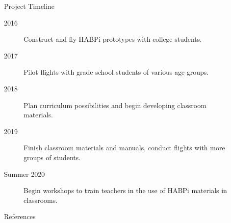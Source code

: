\documentclass[final]{beamer}
\newlength{\sepwid}
\newlength{\onecolwid}
\newlength{\twocolwid}
\begin{document}
\begin{frame}[t]
\begin{columns}[t]
\begin{column}{\twocolwid}
\begin{columns}[t,totalwidth=\twocolwid]
\begin{column}{\onecolwid}
\end{column} %

\end{columns} %

\end{column} %

\begin{column}{\sepwid}\end{column} %

\begin{column}{\onecolwid} %


\begin{block}{Project Timeline}
\begin{description}
\item[2016] Construct and fly HABPi prototypes with college students.
\item[2017] Pilot flights with grade school students of various age groups.
\item[2018] Plan curriculum possibilities and begin developing classroom materials.
\item[2019] Finish classroom materials and manuals, conduct flights with more groups of students.
\item[Summer 2020] Begin workshops to train teachers in the use of HABPi materials in classrooms.
\end{description}

\end{block}


\begin{block}{References}

\nocite{*} %
\small{
\vspace{0.75in}}

\end{block}



\end{column}
\end{columns}
\end{frame}
\end{document}
